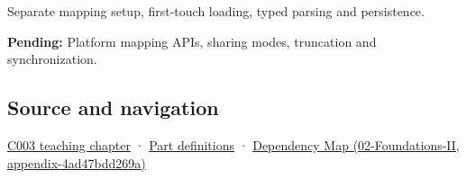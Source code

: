 Separate mapping setup, first-touch loading, typed parsing and persistence.

\textbf{Pending:} Platform mapping APIs, sharing modes, truncation and synchronization.

\subsection{Source and navigation}\label{appendix-313ee7a0ba7b-source-and-navigation}

\hyperref[01-foundations-i-ch002-where-the-bytes-live]{C003 teaching chapter} · \hyperref[appendix-fd090d982a15-m003---parts-41-60]{Part definitions} · \href{../02-Foundations-II/main.pdf\#nameddest=appendix-4ad47bdd269a}{Dependency Map (02-Foundations-II, appendix-4ad47bdd269a)}
